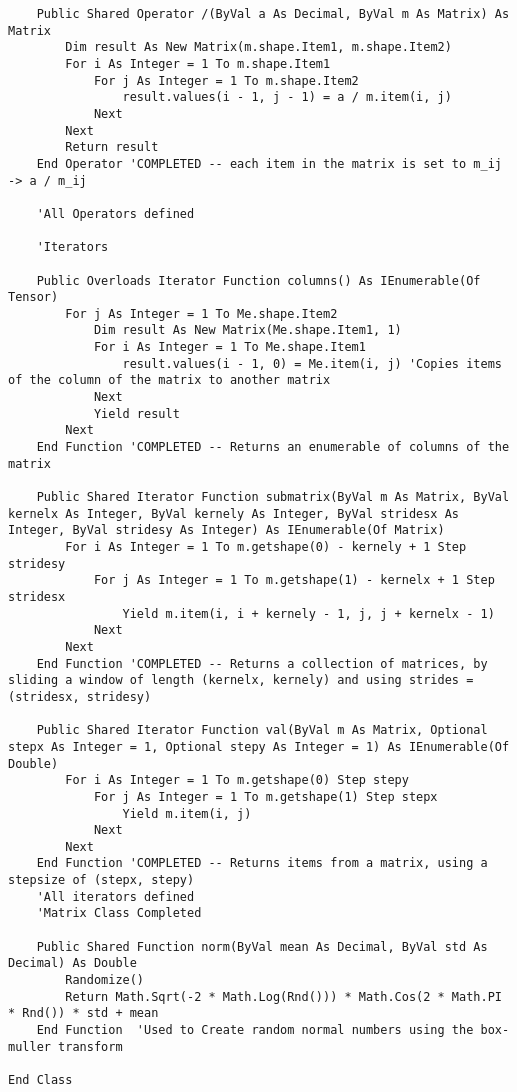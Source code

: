 \begin{verbatim}
    Public Shared Operator /(ByVal a As Decimal, ByVal m As Matrix) As Matrix
        Dim result As New Matrix(m.shape.Item1, m.shape.Item2)
        For i As Integer = 1 To m.shape.Item1
            For j As Integer = 1 To m.shape.Item2
                result.values(i - 1, j - 1) = a / m.item(i, j)
            Next
        Next
        Return result
    End Operator 'COMPLETED -- each item in the matrix is set to m_ij -> a / m_ij 

    'All Operators defined 

    'Iterators

    Public Overloads Iterator Function columns() As IEnumerable(Of Tensor)
        For j As Integer = 1 To Me.shape.Item2
            Dim result As New Matrix(Me.shape.Item1, 1)
            For i As Integer = 1 To Me.shape.Item1
                result.values(i - 1, 0) = Me.item(i, j) 'Copies items of the column of the matrix to another matrix
            Next
            Yield result
        Next
    End Function 'COMPLETED -- Returns an enumerable of columns of the matrix

    Public Shared Iterator Function submatrix(ByVal m As Matrix, ByVal kernelx As Integer, ByVal kernely As Integer, ByVal stridesx As Integer, ByVal stridesy As Integer) As IEnumerable(Of Matrix)
        For i As Integer = 1 To m.getshape(0) - kernely + 1 Step stridesy
            For j As Integer = 1 To m.getshape(1) - kernelx + 1 Step stridesx
                Yield m.item(i, i + kernely - 1, j, j + kernelx - 1)
            Next
        Next
    End Function 'COMPLETED -- Returns a collection of matrices, by sliding a window of length (kernelx, kernely) and using strides = (stridesx, stridesy)

    Public Shared Iterator Function val(ByVal m As Matrix, Optional stepx As Integer = 1, Optional stepy As Integer = 1) As IEnumerable(Of Double)
        For i As Integer = 1 To m.getshape(0) Step stepy
            For j As Integer = 1 To m.getshape(1) Step stepx
                Yield m.item(i, j)
            Next
        Next
    End Function 'COMPLETED -- Returns items from a matrix, using a stepsize of (stepx, stepy)
    'All iterators defined
    'Matrix Class Completed

    Public Shared Function norm(ByVal mean As Decimal, ByVal std As Decimal) As Double
        Randomize()
        Return Math.Sqrt(-2 * Math.Log(Rnd())) * Math.Cos(2 * Math.PI * Rnd()) * std + mean
    End Function  'Used to Create random normal numbers using the box-muller transform

End Class
\end{verbatim}